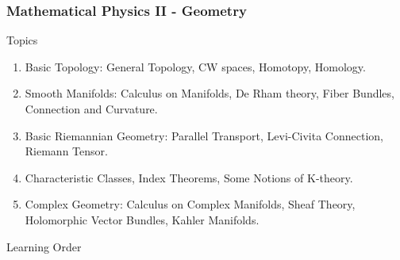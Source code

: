 \documentclass[10pt,a4paper]{book}
\theoremstyle{definition}
\begin{document}
\subsubsection{Mathematical Physics II - Geometry}
Topics
\begin{enumerate}
\item Basic Topology: General Topology, CW spaces, Homotopy, Homology.
\item Smooth Manifolds: Calculus on Manifolds, De Rham theory, Fiber Bundles, Connection and Curvature.
\item Basic Riemannian Geometry: Parallel Transport, Levi-Civita Connection, Riemann Tensor.
\item Characteristic Classes, Index Theorems, Some Notions of K-theory.
\item Complex Geometry: Calculus on Complex Manifolds, Sheaf Theory,  Holomorphic Vector Bundles, Kahler Manifolds.
\end{enumerate}
Learning Order
\end{document}
